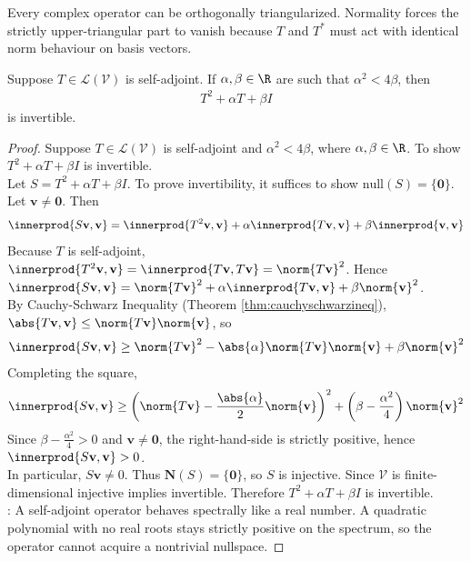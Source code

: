 Every complex operator can be orthogonally triangularized. Normality forces the strictly upper-triangular part to vanish because $T$ and $T^*$ must act with identical norm behaviour on basis vectors.

\begin{lemma} \label{lem:sefladjinvertible} Suppose $T \in \mathcal{L}(\mathcal{V})$ is self-adjoint. If $\alpha, \beta \in \R$ are such that $\alpha^2 < 4 \beta$, then
\begin{align}
T^2 + \alpha T + \beta I \nonumber
\end{align}
is invertible.
\begin{proof} Suppose $T \in \mathcal{L}(\mathcal{V})$ is self-adjoint and $\alpha^2 < 4 \beta$, where $\alpha, \beta \in \R$. To show $T^2 + \alpha T + \beta I$ is invertible.\\
Let $S = T^2 + \alpha T + \beta I$. To prove invertibility, it suffices to show $\text{null}(S) = \{ \mathbf{0} \}$. Let $\mathbf{v} \neq \mathbf{0}$. Then
\begin{align}
\innerprod{S \mathbf{v}, \mathbf{v}} = \innerprod{T^2 \mathbf{v}, \mathbf{v}} + \alpha \innerprod{T \mathbf{v}, \mathbf{v}} + \beta \innerprod{\mathbf{v}, \mathbf{v}} \nonumber
\end{align}
Because $T$ is self-adjoint, $\innerprod{T^2 \mathbf{v}, \mathbf{v}} = \innerprod{T \mathbf{v}, T \mathbf{v}} = \norm{T \mathbf{v}}^2$. Hence $\innerprod{S \mathbf{v}, \mathbf{v}} = \norm{T \mathbf{v}}^2 + \alpha \innerprod{T \mathbf{v}, \mathbf{v}} + \beta \norm{\mathbf{v}}^2$.\\
By Cauchy-Schwarz Inequality (Theorem \ref{thm:cauchyschwarzineq}), $\abs{T \mathbf{v}, \mathbf{v}} \leq \norm{T \mathbf{v}} \norm{\mathbf{v}}$, so
\begin{align}
\innerprod{S \mathbf{v}, \mathbf{v}} \geq \norm{T \mathbf{v}}^2 - \abs{\alpha} \norm{T \mathbf{v}} \norm{\mathbf{v}} + \beta \norm{\mathbf{v}}^2 \nonumber
\end{align}
Completing the square,
\begin{align}
\innerprod{S \mathbf{v}, \mathbf{v}} \geq \left( \norm{T \mathbf{v}} - \frac{\abs{\alpha}}{2} \norm{\mathbf{v}} \right)^2 + \left( \beta - \frac{\alpha^2}{4} \right) \norm{\mathbf{v}}^2 \nonumber
\end{align}
Since $\beta - \frac{\alpha^2}{4} > 0$ and $\mathbf{v} \neq \mathbf{0}$, the right-hand-side is strictly positive, hence $\innerprod{S \mathbf{v}, \mathbf{v}} > 0$.\\
In particular, $S \mathbf{v} \neq 0$. Thus $\mathbf{N}(S) = \{ \mathbf{0} \}$, so $S$ is injective. Since $\mathcal{V}$ is finite-dimensional injective implies invertible. Therefore $T^2 + \alpha T + \beta I$ is invertible.\\
: A self-adjoint operator behaves spectrally like a real number. A quadratic polynomial with no real roots stays strictly positive on the spectrum, so the operator cannot acquire a nontrivial nullspace.
\end{proof}
\end{lemma}

